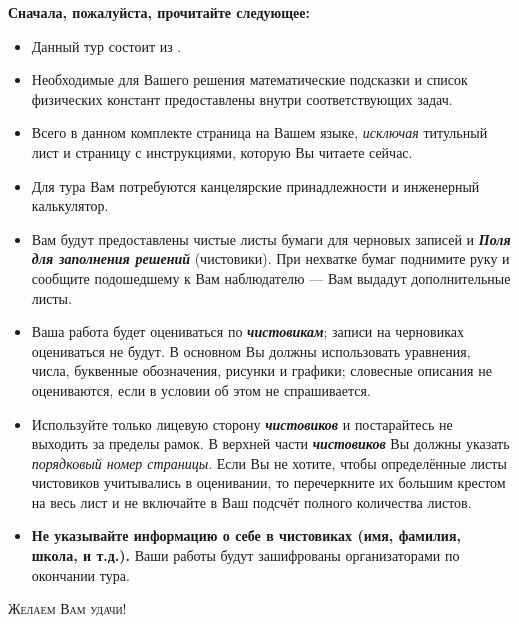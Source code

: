\thispagestyle{empty}
\begin{center}
    \LARGE\textbf{\scshape{}}%
\end{center}
%
\vspace{2pt}%
%
\begin{center}
    \large{}
\end{center}
\vspace{2pt}
\begin{center}
    \large\textbf{Сначала, пожалуйста, прочитайте следующее:}
\end{center}
\vspace{4pt}

\begin{itemize}[leftmargin=*]
\item Данный тур состоит из .
\item Необходимые для Вашего решения математические подсказки и список физических констант предоставлены внутри соответствующих задач.
\item Всего в данном комплекте \pageref{LastPage} страница на Вашем языке, \textit{исключая} титульный лист и страницу с инструкциями, которую Вы читаете сейчас.
\item Для тура Вам потребуются канцелярские принадлежности и инженерный калькулятор.
\item Вам будут предоставлены чистые листы бумаги для черновых записей и \textbf{\textit{Поля для заполнения решений}} (чистовики). При нехватке бумаг поднимите руку и сообщите подошедшему к Вам наблюдателю --- Вам выдадут дополнительные листы.
\item Ваша работа будет оцениваться по \textbf{\textit{чистовикам}}; записи на черновиках оцениваться не будут. В основном Вы должны использовать уравнения, числа, буквенные обозначения, рисунки и графики; словесные описания не оцениваются, если в условии об этом не спрашивается.
\item Используйте только лицевую сторону \textbf{\textit{чистовиков}} и постарайтесь не выходить за пределы рамок. В верхней части \textbf{\textit{чистовиков}} Вы должны указать \textit{порядковый номер страницы}. Если Вы не хотите, чтобы определённые листы чистовиков учитывались в оценивании, то перечеркните их большим крестом на весь лист и не включайте в Ваш подсчёт полного количества листов.
\item \textbf{Не указывайте информацию о себе в чистовиках (имя, фамилия, школа, и т.д.).} Ваши работы будут зашифрованы организаторами по окончании тура.
\end{itemize}
%
\vspace{4pt}
\begin{center}
    \textsc{Желаем Вам удачи!}
\end{center}%
%
\begin{center}
    \textit{}
\end{center}

\newpage